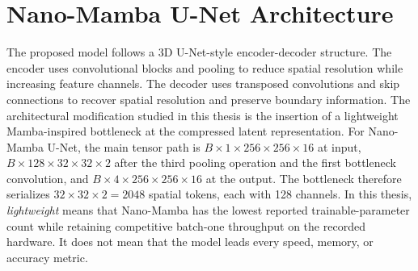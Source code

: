 \section{Nano-Mamba U-Net Architecture}
The proposed model follows a 3D U-Net-style encoder-decoder structure. The encoder uses convolutional blocks and pooling to reduce spatial resolution while increasing feature channels. The decoder uses transposed convolutions and skip connections to recover spatial resolution and preserve boundary information. The architectural modification studied in this thesis is the insertion of a lightweight Mamba-inspired bottleneck at the compressed latent representation. For Nano-Mamba U-Net, the main tensor path is $B\times1\times256\times256\times16$ at input, $B\times128\times32\times32\times2$ after the third pooling operation and the first bottleneck convolution, and $B\times4\times256\times256\times16$ at the output. The bottleneck therefore serializes $32\times32\times2=2048$ spatial tokens, each with 128 channels. In this thesis, \emph{lightweight} means that Nano-Mamba has the lowest reported trainable-parameter count while retaining competitive batch-one throughput on the recorded hardware. It does not mean that the model leads every speed, memory, or accuracy metric.

